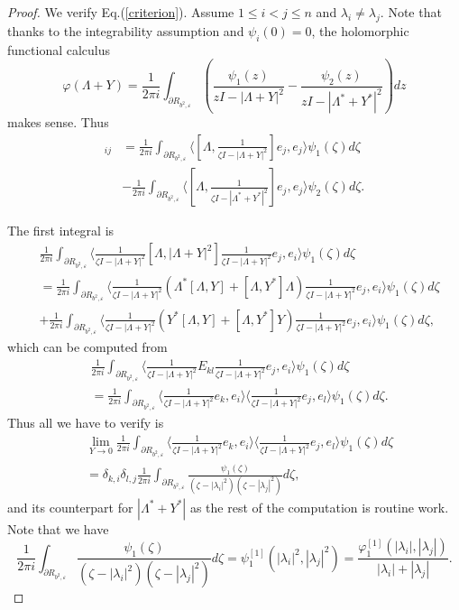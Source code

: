 \documentclass[10pt,a4paper]{amsart}
\newcommand{\inpr}[2]{\langle{#1,#2}\rangle}
\begin{document}
\begin{proof} We verify Eq.(\ref{criterion}). 
Assume $1\leq i<j\leq n$ and $\lambda_i\neq \lambda_j$. 
Note that thanks to the integrability assumption and $\psi_i(0)=0$, the holomorphic functional calculus 
	\[\varphi(\Lambda+Y)=\frac{1}{2\pi i}\int_{\partial R_{b^2,\varepsilon}}
	\left(\frac{\psi_1(z)}{zI-|\Lambda+Y|^2}-\frac{\psi_2(z)}{zI-|\Lambda^*+Y^*|^2}\right)
	dz\]
makes sense. 
Thus 
\begin{align*}[\Lambda,P(Y)]_{ij}
	& =\frac{1}{2\pi i}\int_{\partial R_{b^2,\varepsilon}} \inpr{[\Lambda,\frac{1}{\zeta I-|\Lambda+Y|^2}]e_j}{e_j}\psi_1(\zeta)d\zeta \\
	&-\frac{1}{2\pi i}\int_{\partial R_{b^2,\varepsilon}} \inpr{[\Lambda,\frac{1}{\zeta I-|\Lambda^*+Y^*|^2}]e_j}{e_j}\psi_2(\zeta)d\zeta.
\end{align*}

The first integral is 
\begin{align*}
	&\frac{1}{2\pi i}\int_{\partial R_{b^2,\varepsilon}} \inpr{
		\frac{1}{\zeta I-|\Lambda+Y|^2}
		[\Lambda,|\Lambda+Y|^2] 
		\frac{1}{\zeta I-|\Lambda+Y|^2} e_j}{e_i}
	\psi_1(\zeta)d\zeta \\
	&=\frac{1}{2\pi i}\int_{\partial R_{b^2,\varepsilon}} \inpr{
		\frac{1}{\zeta I-|\Lambda+Y|^2}
		(\Lambda^*[\Lambda,Y]+[\Lambda,Y^*]\Lambda) 
		\frac{1}{\zeta I-|\Lambda+Y|^2} e_j}{e_i}
	\psi_1(\zeta)d\zeta \\
	&+\frac{1}{2\pi i}\int_{\partial R_{b^2,\varepsilon}} \inpr{
		\frac{1}{\zeta I-|\Lambda+Y|^2}
		(Y^*[\Lambda,Y]+[\Lambda,Y^*]Y) 
		\frac{1}{\zeta I-|\Lambda+Y|^2} e_j}{e_i}
	\psi_1(\zeta)d\zeta, 
\end{align*}
which can be computed from 
\begin{align*}
	&\frac{1}{2\pi i}\int_{\partial R_{b^2,\varepsilon}} \inpr{
		\frac{1}{\zeta I-|\Lambda+Y|^2}
		E_{kl} 
		\frac{1}{\zeta I-|\Lambda+Y|^2} e_j}{e_i}	\psi_1(\zeta)d\zeta\\ \nonumber
	&=\frac{1}{2\pi i}\int_{\partial R_{b^2,\varepsilon}} \inpr{\frac{1}{\zeta I-|\Lambda+Y|^2} e_k}{e_i}\inpr{\frac{1}{\zeta I-|\Lambda+Y|^2} e_j}{e_l}	\psi_1(\zeta)d\zeta. \nonumber
\end{align*}
Thus all we have to verify is  
\begin{align}\label{limit} 
	&\lim_{Y\to 0}
	\frac{1}{2\pi i}\int_{\partial R_{b^2,\varepsilon}} \inpr{\frac{1}{\zeta I-|\Lambda+Y|^2} e_k}{e_i}\inpr{\frac{1}{\zeta I-|\Lambda+Y|^2} e_j}{e_l}	\psi_1(\zeta)d\zeta\\ \nonumber
	&=\delta_{k,i}\delta_{l,j}\frac{1}{2\pi i}\int_{\partial R_{b^2,\varepsilon}}\frac{\psi_1(\zeta)}{(\zeta-|\lambda_i|^2)(\zeta-|\lambda_j|^2)}d\zeta,
\end{align}
and its counterpart for $|\Lambda^*+Y^*|$ as the rest of the computation is routine work. 
Note that we have 
\[\frac{1}{2\pi i}\int_{\partial R_{b^2,\varepsilon}}\frac{\psi_1(\zeta)}{(\zeta-|\lambda_i|^2)(\zeta-|\lambda_j|^2)}d\zeta
=\psi^{[1]}_1(|\lambda_i|^2,|\lambda_j|^2)
=\frac{\varphi_1^{[1]}(|\lambda_i|,|\lambda_j|)}{|\lambda_i|+|\lambda_j|}.\]





\end{proof}
\end{document}
